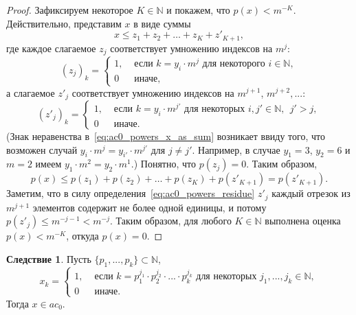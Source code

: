 \documentclass[a4paper,openbib]{article}
\renewcommand{\leq}{\leqslant}
\theoremstyle{definition}
\newtheorem{corollary}{Следствие}[lemma]
\begin{document}
\begin{proof}
	Зафиксируем некоторое $K \in \mathbb{N}$ и покажем, что $p(x) < m^{-K}$.
	Действительно, представим $x$ в виде суммы
	\begin{equation}
		\label{eq:ac0_powers_x_as_sum}
		x \leq z_1 + z_2 + \dots + z_K + z'_{K+1}
		,
	\end{equation}
	где каждое слагаемое $z_j$ соответствует умножению индексов на $m^j$:
	\begin{equation}
		(z_j)_k = \begin{cases}
			1, &\mbox{~если~} k = y_i \cdot m^j \mbox{~для некоторого~} i\in\mathbb{N},
			\\
			0  &\mbox{~иначе}
			,
		\end{cases}
	\end{equation}
	а слагаемое $z'_j$ соответствует умножению индексов на $m^{j+1}$, $m^{j+2},...$:
	\begin{equation}
		\label{eq:ac0_powers_residue}
		(z'_j)_k = \begin{cases}
			1, &\mbox{~если~} k = y_i \cdot m^{j'} \mbox{~для некоторых~} i,j'\in\mathbb{N},~~ j' > j
			,%
			\\
			0  &\mbox{~иначе}
			.
		\end{cases}
	\end{equation}
	(Знак неравенства в~\eqref{eq:ac0_powers_x_as_sum} возникает ввиду того, что возможен случай
	$y_i \cdot m^j = y_{i'} \cdot m^{j'}$ для $j\neq j'$.
	Например, в случае $y_1 = 3$, $y_2 = 6$ и $m=2$ имеем $y_1 \cdot m^2 = y_2 \cdot m^1$.)
	Понятно, что $p(z_j)=0$.
	Таким образом,
	\begin{equation}
		p(x) \leq p(z_1) + p(z_2) + \dots + p(z_K) + p(z'_{K+1}) = p(z'_{K+1})
		.
	\end{equation}
	Заметим, что в силу определения~\eqref{eq:ac0_powers_residue} $z'_j$ каждый отрезок из $m^{j+1}$ элементов
	содержит не более одной единицы, и потому $p(z'_j) \leq m^{-j-1} < m^{-j}$.
	Таким образом, для любого $K\in\mathbb{N}$ выполнена оценка $p(x) < m^{-K}$,
	откуда $p(x) = 0$.
\end{proof}

\begin{corollary}
	\label{cor:ac0_powers_finite_set_of_numbers}
	Пусть $\{p_1, ..., p_k\} \subset \mathbb{N}$,
	\begin{equation}
		x_k = \begin{cases}
			1, &\mbox{~если~} k = p_1^{j_1}\cdot p_2^{j_2}\cdot ... \cdot p_k^{j_k} \mbox{~для некоторых~} j_1,...,j_k\in\mathbb{N},
			\\
			0  &\mbox{~иначе}.
		\end{cases}
	\end{equation}
	Тогда $x\in ac_0$.
\end{corollary}
\end{document}
